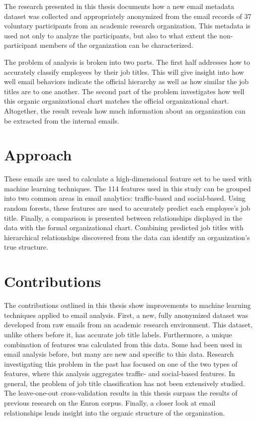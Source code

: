 \documentclass[12pt]{report}
\begin{document}
The research presented in this thesis documents how a new email metadata dataset was collected and appropriately anonymized from the email records of 37 voluntary participants from an academic research organization.
This metadata is used not only to analyze the participants, but also to what extent the non-participant members of the organization can be characterized.


The problem of analysis is broken into two parts.
The first half addresses how to accurately classify employees by their job titles.
This will give insight into how well email behaviors indicate the official hierarchy as well as how similar the job titles are to one another.
The second part of the problem investigates how well this organic organizational chart matches the official organizational chart.
Altogether, the result reveals how much information about an organization can be extracted from the internal emails.



\section{Approach}
These emails are used to calculate a high-dimensional feature set to be used with machine learning techniques.
The 114 features used in this study can be grouped into two common areas in email analytics: traffic-based and social-based.
Using random forests, these features are used to accurately predict each employee's job title.
Finally, a comparison is presented between relationships displayed in the data with the formal organizational chart.
Combining predicted job titles with hierarchical relationships discovered from the data can identify an organization's true structure.

\section{Contributions}
The contributions outlined in this thesis show improvements to machine learning techniques applied to email analysis.  
First, a new, fully anonymized dataset was developed from raw emails from an academic research environment.  
This dataset, unlike others before it, has accurate job title labels.  
Furthermore, a unique combination of features was calculated from this data.  
Some had been used in email analysis before, but many are new and specific to this data.
Research investigating this problem in the past has focused on one of the two types of features, where this analysis aggregates traffic- and social-based features.
In general, the problem of job title classification has not been extensively studied.  
The leave-one-out cross-validation results in this thesis surpass the results of previous research on the Enron corpus.
Finally, a closer look at email relationships lends insight into the organic structure of the organization.
\end{document}
